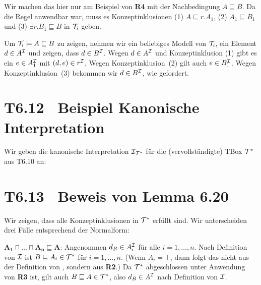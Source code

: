 \documentclass[fontsize=11pt, twoside=false, numbers=autoenddot]{scrbook}
\begin{document}
Wir machen das hier nur am Beispiel von \textbf{\textsf{R4}} mit der
Nachbedingung $A\sqsubseteq B$. Da die Regel anwendbar war, muss es
Konzeptinklusionen (1) $A\sqsubseteq r.A_1$, (2) $A_1\sqsubseteq B_1$
und (3) $\exists r.B_1\sqsubseteq B$ in $\mathcal{T}_i$ geben. 

Um $\mathcal{T}_i\models A\sqsubseteq B$ zu zeigen, nehmen wir ein beliebiges
Modell \Imc von $\mathcal{T}_i$, ein Element $d\in A^\mathcal{I}$ und zeigen, dass
$d\in B^\mathcal{I}$. Wegen $d\in A^\mathcal{I}$ und Konzeptinklusion (1) gibt es
ein $e\in A_1^\mathcal{I}$ mit $(d,e)\in r^\mathcal{I}$. Wegen Konzeptinklusion~(2)
gilt auch $e\in B_1^\mathcal{I}$. Wegen Konzeptinklusion~(3) bekommen wir
$d\in B^\mathcal{I}$, wie gefordert. 


\section*{T6.12~ Beispiel Kanonische Interpretation}

Wir geben die kanonische Interpretation $\mathcal{I}_{\mathcal{T}^*}$ für die
(vervollständigte) TBox $\mathcal{T}^*$ aus T6.10 an: 
% 
\begin{center}
\end{center}

\section*{T6.13~ Beweis von Lemma 6.20}

Wir zeigen, dass alle Konzeptinklusionen in $\mathcal{T}^*$ erfüllt sind. Wir
unterscheiden drei Fälle entsprechend der Normalform: 

\smallskip\noindent
$\mathbf{A_1\sqcap\ldots\sqcap A_n\sqsubseteq A}$: Angenommen
$d_B\in A_i^\mathcal{I}$ für alle $i=1,\ldots,n$. Nach Definition von
$\mathcal{I}$ ist $B\sqsubseteq A_i\in \mathcal{T}^*$ für $i=1,\ldots,n$. (Wenn
$A_i=\top$, dann folgt das nicht aus der Definition von \Imc, sondern
aus \textbf{\textsf{R2}}.) Da $\mathcal{T}^*$ abgeschlossen unter Anwendung
von \textbf{\textsf{R3}} ist, gilt auch $B\sqsubseteq A\in \mathcal{T}^*$,
also $d_B\in A^\mathcal{I}$ nach Definition von $\mathcal{I}$.
\end{document}
